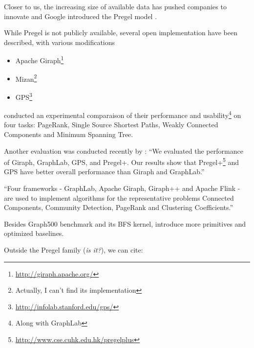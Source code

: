 Closer to us, the increasing size of available data has pushed companies to
innovate and Google introduced the Pregel model \autocite{Pregel10}.

While Pregel is not publicly available, several open implementation have been
described, with various modifications

\begin{itemize}
	\item Apache
		Giraph\footnote{\href{http://giraph.apache.org/}{http://giraph.apache.org/}}
	\item Mizan\footnote{Actually, I can't find its implementation} \autocite{Khayyat2013}
	\item
		GPS\footnote{\href{http://infolab.stanford.edu/gps/}{http://infolab.stanford.edu/gps/}}
		\autocite{Salihoglu2013}
\end{itemize}

\Textcite{Han2014} conducted an experimental comparaison of their performance and
usability\footnote{Along with GraphLab} on four tasks: PageRank, Single Source
Shortest Paths, Weakly Connected Components and Minimum Spanning Tree.

Another evaluation was conducted recently by \textcite{Lu2015}: \enquote{We
evaluated the performance of Giraph, GraphLab, GPS, and Pregel+. Our results
show that
Pregel+\footnote{\href{http://www.cse.cuhk.edu.hk/pregelplus/index.html}%
{http://www.cse.cuhk.edu.hk/pregelplus}} \autocite{Yan2015} and GPS have
better overall performance than Giraph and GraphLab.}

\enquote{Four frameworks - GraphLab, Apache Giraph, Giraph++ and Apache Flink -
are used to implement algorithms for the representative problems Connected
Components, Community Detection, PageRank and Clustering Coefficients.}
\autocite{Koch2016}

Besides Graph500 benchmark and its BFS kernel, \textcite{Beamer2015} introduce
more primitives and optimized baselines.

Outside the Pregel family (\emph{is it?}), we can cite:

